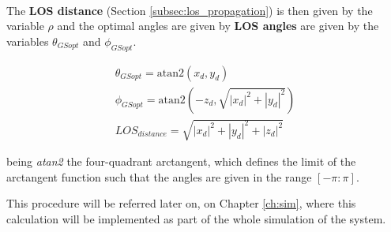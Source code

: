 \paragraph{} The \textbf{LOS distance} (Section \ref{subsec:los_propagation}) is then given by the variable $\rho$ and the optimal angles are given by \textbf{LOS angles} are given by the variables $\theta_{GSopt}$ and $\phi_{GSopt}$.

\begin{align}\label{eq:OptGS}
  \theta_{GSopt} = \text{atan2}\left(x_{d}, y_{d}\right) \nonumber \\
  \phi_{GSopt}=  \text{atan2}\left(-z_{d}, \sqrt{|x_{d}|^{2}+|y_{d}|^{2}}\right) \\
  LOS_{distance} = \sqrt{|x_{d}|^{2}+|y_{d}|^{2}+|z_{d}|^{2}} \nonumber
\end{align}

being \textit{atan2} the four-quadrant arctangent, which defines the limit of the arctangent function such that the angles are given in the range $[-\pi:\pi]$.

This procedure will be referred later on, on Chapter \ref{ch:sim}, where this calculation will be implemented as part of the whole simulation of the system.

